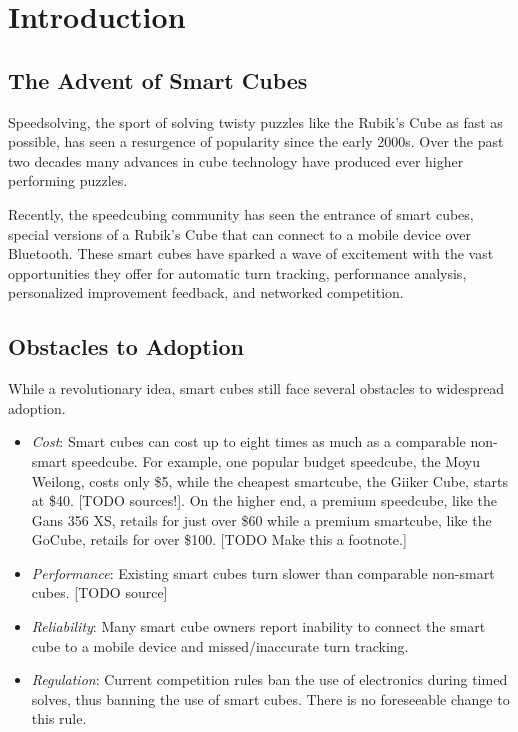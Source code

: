 
\chapter{Introduction} %

\label{Chapter1} %



\section{The Advent of Smart Cubes}
Speedsolving, the sport of solving twisty puzzles like the Rubik’s Cube as fast as possible, has seen a resurgence of popularity since the early 2000s. 
Over the past two decades many advances in cube technology have produced ever higher performing puzzles. 

Recently, the speedcubing community has seen the entrance of smart cubes, special versions of a Rubik’s Cube that can connect to a mobile device over Bluetooth. 
These smart cubes have sparked a wave of excitement with the vast opportunities they offer for automatic turn tracking, performance analysis, personalized improvement feedback, and networked competition.

\section{Obstacles to Adoption}
While a revolutionary idea, smart cubes still face several obstacles to widespread adoption. 

\begin{itemize}
    \item \emph{Cost}: Smart cubes can cost up to eight times as much as a comparable non-smart speedcube. For example, one popular budget speedcube, the Moyu Weilong, costs only \$5, while the cheapest smartcube, the Giiker Cube, starts at \$40. [TODO sources!]. On the higher end, a premium speedcube, like the Gans 356 XS, retails for just over \$60 while a premium smartcube, like the GoCube, retails for over \$100. [TODO Make this a footnote.]
    \item \emph{Performance}: Existing smart cubes turn slower than comparable non-smart cubes. [TODO source]
    \item \emph{Reliability}: Many smart cube owners report inability to connect the smart cube to a mobile device and missed/inaccurate turn tracking.
    \item \emph{Regulation}: Current competition rules ban the use of electronics during timed solves, thus banning the use of smart cubes. There is no foreseeable change to this rule. 
\end{itemize}

